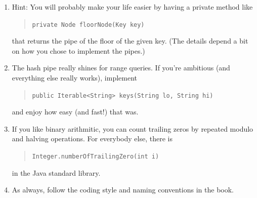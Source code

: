 \documentclass{tufte-handout}
\begin{document}
\begin{enumerate}
  \item Hint: You will probably make your life easier by having  a private method like \begin{quote}
    \tt private Node floorNode(Key key)
    \end{quote}
    that returns the pipe of the floor of the given key.
      (The details depend a bit on how you chose to implement the pipes.)


    \item The hash pipe really shines for range queries.
      If you're ambitious (and everything else really works), implement 
      \begin{quote}
	\tt public Iterable<String> keys(String lo, String hi)
      \end{quote}
      and enjoy how easy (and fast!) that was.

    \item If you like binary arithmitic, you can count trailing zeros by repeated modulo and halving operations.
      For everybody else, there is 
    \begin{quote}
    \tt Integer.numberOfTrailingZero(int i)
  \end{quote}
  in the Java standard library.

    \item As always, follow the coding style and naming conventions in the book.

\end{enumerate}
\end{document}
